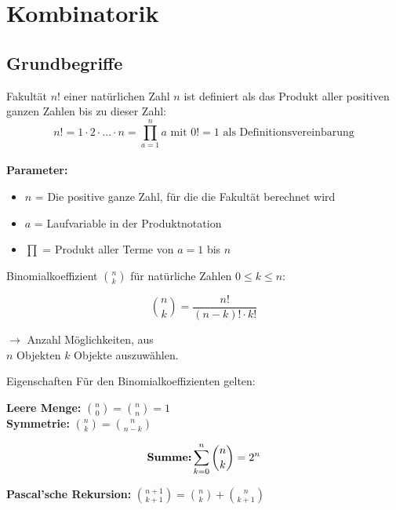 \section{Kombinatorik}


\subsection{Grundbegriffe}

\begin{definition}{Fakultät}
$n!$ einer natürlichen Zahl $n$ ist definiert als das Produkt aller positiven ganzen Zahlen bis zu dieser Zahl:
\vspace{-2mm}\\
$$
n!=1 \cdot 2 \cdot \ldots \cdot n=\prod_{a=1}^{n} a \text{ mit } 0! = 1 \text{ als Definitionsvereinbarung}
$$
\vspace{-4mm}\\
\textbf{Parameter:}
\begin{itemize}
    \item $n$ = Die positive ganze Zahl, für die die Fakultät berechnet wird
    \item $a$ = Laufvariable in der Produktnotation
    \item $\prod$ = Produkt aller Terme von $a=1$ bis $n$
\end{itemize}
\end{definition}

\begin{definition}{Binomialkoeffizient}
$\binom{n}{k}$ für natürliche Zahlen $0 \leq k \leq n$:

\begin{minipage}{0.5\textwidth}
$$\binom{n}{k} = \frac{n!}{(n-k)! \cdot k!}$$
\end{minipage}
\begin{minipage}{0.5\textwidth}
$\rightarrow$ Anzahl Möglichkeiten, aus \\$n$ Objekten $k$ Objekte auszuwählen.
\end{minipage}
\end{definition}

\begin{theorem}{Eigenschaften}
Für den Binomialkoeffizienten gelten:

\begin{minipage}{0.5\textwidth}
   \textbf{Leere Menge:} $\binom{n}{0} = \binom{n}{n} = 1$
   \vspace{1mm}\\
   \textbf{Symmetrie:} $\binom{n}{k} = \binom{n}{n-k}$
\end{minipage}
\begin{minipage}{0.5\textwidth}
   $$\text{\textbf{Summe:}} \sum_{k=0}^n \binom{n}{k} = 2^n$$
\end{minipage}

\textbf{Pascal'sche Rekursion:} $\binom{n+1}{k+1} = \binom{n}{k} + \binom{n}{k+1}$

\end{theorem}

